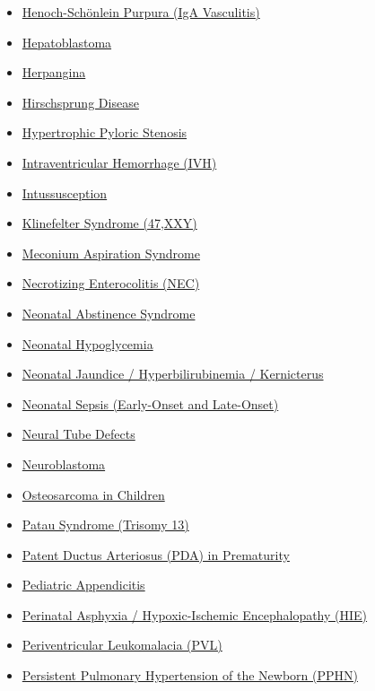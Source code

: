 \begin{itemize}[noitemsep]
  \item \hyperlink{sec:Henoch-Schonlein Purpura}{Henoch-Sch\"onlein Purpura (IgA Vasculitis)}
  \item \hyperlink{sec:Hepatoblastoma}{Hepatoblastoma}
  \item \hyperlink{sec:Herpangina}{Herpangina}
  \item \hyperlink{sec:Hirschsprung Disease}{Hirschsprung Disease}
  \item \hyperlink{sec:Hypertrophic Pyloric Stenosis}{Hypertrophic Pyloric Stenosis}
  \item \hyperlink{sec:Intraventricular Hemorrhage}{Intraventricular Hemorrhage (IVH)}
  \item \hyperlink{sec:Intussusception}{Intussusception}
  \item \hyperlink{sec:Klinefelter Syndrome}{Klinefelter Syndrome (47,XXY)}
  \item \hyperlink{sec:Meconium Aspiration Syndrome}{Meconium Aspiration Syndrome}
  \item \hyperlink{sec:Necrotizing Enterocolitis}{Necrotizing Enterocolitis (NEC)}
  \item \hyperlink{sec:Neonatal Abstinence Syndrome}{Neonatal Abstinence Syndrome}
  \item \hyperlink{sec:Neonatal Hypoglycemia}{Neonatal Hypoglycemia}
  \item \hyperlink{sec:Neonatal Jaundice}{Neonatal Jaundice / Hyperbilirubinemia / Kernicterus}
  \item \hyperlink{sec:Neonatal Sepsis}{Neonatal Sepsis (Early-Onset and Late-Onset)}
  \item \hyperlink{sec:Neural Tube Defects}{Neural Tube Defects}
  \item \hyperlink{sec:Neuroblastoma}{Neuroblastoma}
  \item \hyperlink{sec:Osteosarcoma in Children}{Osteosarcoma in Children}
  \item \hyperlink{sec:Patau Syndrome}{Patau Syndrome (Trisomy 13)}
  \item \hyperlink{sec:Patent Ductus Arteriosus in Prematurity}{Patent Ductus Arteriosus (PDA) in Prematurity}
  \item \hyperlink{sec:Pediatric Appendicitis}{Pediatric Appendicitis}
  \item \hyperlink{sec:Hypoxic-Ischemic Encephalopathy}{Perinatal Asphyxia / Hypoxic-Ischemic Encephalopathy (HIE)}
  \item \hyperlink{sec:Periventricular Leukomalacia}{Periventricular Leukomalacia (PVL)}
  \item \hyperlink{sec:Persistent Pulmonary Hypertension of the Newborn}{Persistent Pulmonary Hypertension of the Newborn (PPHN)}

\end{itemize}
